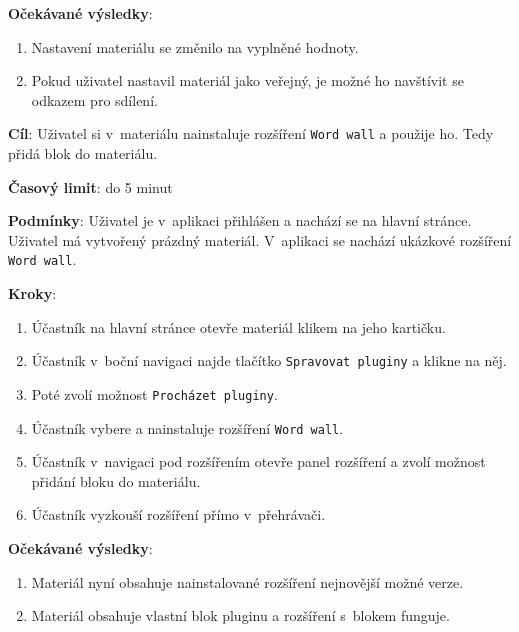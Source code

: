 \textbf{Očekávané výsledky}:

\begin{enumerate}[leftmargin=1.4cm]
    \item Nastavení materiálu se změnilo na vyplněné hodnoty.
    \item Pokud uživatel nastavil materiál jako veřejný, je možné ho navštívit se odkazem pro sdílení.
\end{enumerate}




\vspace{1em}

\textbf{Cíl}: Uživatel si v~materiálu nainstaluje rozšíření \verb|Word wall| a použije ho. Tedy přidá blok do materiálu.

\textbf{Časový limit}: do 5 minut

\textbf{Podmínky}:  Uživatel je v~aplikaci přihlášen a nachází se na hlavní stránce.  Uživatel má vytvořený prázdný materiál. V~aplikaci se nachází ukázkové rozšíření \verb|Word wall|.

\textbf{Kroky}:

\begin{enumerate}[leftmargin=1.4cm]
    \item Účastník na hlavní stránce otevře materiál klikem na jeho kartičku.
    \item Účastník v~boční navigaci najde tlačítko \verb|Spravovat pluginy| a klikne na něj.
    \item Poté zvolí možnost \verb|Procházet pluginy|.
    \item Účastník vybere a nainstaluje rozšíření \verb|Word wall|.
    \item Účastník v~navigaci pod rozšířením otevře panel rozšíření a zvolí možnost přidání bloku do materiálu.
    \item Účastník vyzkouší rozšíření přímo v~přehrávači.
\end{enumerate}

\textbf{Očekávané výsledky}:

\begin{enumerate}[leftmargin=1.4cm]
    \item Materiál nyní obsahuje nainstalované rozšíření nejnovější možné verze.
    \item Materiál obsahuje vlastní blok pluginu a rozšíření s~blokem funguje.
\end{enumerate}



